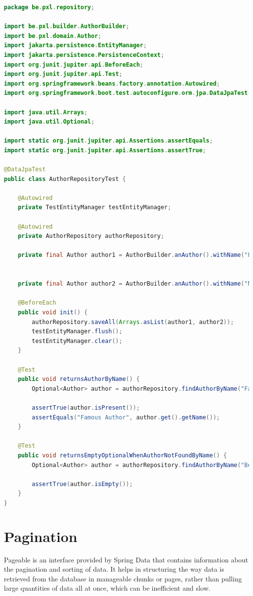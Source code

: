 \begin{lstlisting}[frame=single, language=java]
package be.pxl.repository;

import be.pxl.builder.AuthorBuilder;
import be.pxl.domain.Author;
import jakarta.persistence.EntityManager;
import jakarta.persistence.PersistenceContext;
import org.junit.jupiter.api.BeforeEach;
import org.junit.jupiter.api.Test;
import org.springframework.beans.factory.annotation.Autowired;
import org.springframework.boot.test.autoconfigure.orm.jpa.DataJpaTest;

import java.util.Arrays;
import java.util.Optional;

import static org.junit.jupiter.api.Assertions.assertEquals;
import static org.junit.jupiter.api.Assertions.assertTrue;

@DataJpaTest
public class AuthorRepositoryTest {

	@Autowired
	private TestEntityManager testEntityManager;

	@Autowired
	private AuthorRepository authorRepository;

	private final Author author1 = AuthorBuilder.anAuthor().withName("Famous Author").build();


	private final Author author2 = AuthorBuilder.anAuthor().withName("Not So Famous Author").build();

	@BeforeEach
	public void init() {
		authorRepository.saveAll(Arrays.asList(author1, author2));
		testEntityManager.flush();
		testEntityManager.clear();
	}

	@Test
	public void returnsAuthorByName() {
		Optional<Author> author = authorRepository.findAuthorByName("Famous Author");

		assertTrue(author.isPresent());
		assertEquals("Famous Author", author.get().getName());
	}

	@Test
	public void returnsEmptyOptionalWhenAuthorNotFoundByName() {
		Optional<Author> author = authorRepository.findAuthorByName("Bestseller Author");

		assertTrue(author.isEmpty());
	}
}
\end{lstlisting}


\section{Pagination}

Pageable is an interface provided by Spring Data that contains information about the pagination and sorting of data. It helps in structuring the way data is retrieved from the database in manageable chunks or pages, rather than pulling large quantities of data all at once, which can be inefficient and slow.


